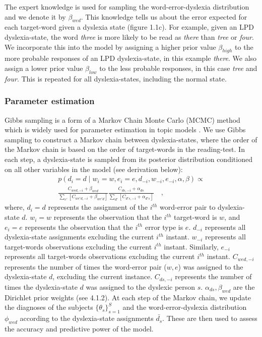 The expert knowledge is used for sampling the word-error-dyslexia distribution and we denote it by $ \beta_{wed} $. This knowledge tells us about the error expected for each target-word given a dyslexia state (figure 1.1c). For example, given an LPD dyslexia-state, the word {\it three} is more likely to be read as {\it there} than {\it tree} or {\it four}. We incorporate this into the model by assigning a higher prior value $ \beta_{high} $ to the more probable responses of an LPD dyslexia-state, in this example {\it there}. We also assign a lower prior value $ \beta_{low} $ to the less probable responses, in this case {\it tree} and {\it four}. This is repeated for all dyslexia-states, including the normal state.

\vfill

\subsubsection{Parameter estimation}
Gibbs sampling is a form of a Markov Chain Monte Carlo (MCMC) method which is widely used for parameter estimation in topic models \citep{gs04, rgss04}. We use Gibbs sampling to construct a Markov chain between dyslexia-states, where the order of the Markov chain is based on the order of target-words in the reading-test. In each step, a dyslexia-state is sampled from its posterior distribution conditioned on all other variables in the model (see derivation below): 
\begin{equation}
\begin{split}
p(d_i = d\mid w_i = w, e_i = e, d_{-i}, w_{-i}, e_{-i}, \alpha, \beta) \propto \\
\frac{ C_{wed, -i} + \beta_{wed} } {\sum_{e'} [C_{we'd, -i} + \beta_{we'd}] } \frac{ C_{ds, -i} + \alpha_{ds} } {{\sum_{d'}[ C_{d's, -i} + \alpha_{d's}] }} \quad ,
\end{split}
\end{equation}
where, $ d_i=d $ represents the assignment of the $ i^{th} $ word-error pair to dyslexia-state $d$. $ w_i = w $ represents the observation that the $i^{th}$ target-word is $w$, and $e_i = e $ represents the observation that the $i^{th}$ error type is $e$. $ d_{-i} $ represents all dyslexia-state assignments excluding the current $i^{th}$ instant. $ w_{-i} $ represents all target-words observations excluding the current $i^{th}$ instant. Similarly, $ e_{-i} $ represents all target-words observations excluding the current $i^{th}$ instant.
$ C_{wed, -i} $ represents the number of times the word-error pair ($w, e$) was assigned to the dyslexia-state $d$, excluding the current instance. $ C_{ds, -i} $ represents the number of times the dyslexia-state $d$ was assigned to the dyslexic person $s$. $ \alpha_{ds} , \beta_{wed} $ are the Dirichlet prior weights (see 4.1.2).
At each step of the Markov chain, we update the diagnoses of the subjects $ { \{ \theta_{s} \} }_{s=1}^S $ and the word-error-dyslexia distribution $ \phi_{wed} $ according to the dyslexia-state assignments $ \bar{d_{s}} $. These are then used to assess the accuracy and predictive power of the model.

